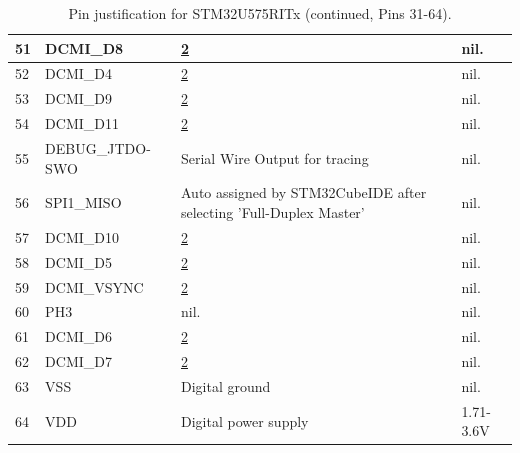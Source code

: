 \begin{table}[H]
\begin{tabular}{|l|p{3cm}|p{6.5cm}|p{3.5cm}|}
        51 & DCMI\_D8 & \hyperlink{dcmi-reason}{2} & nil. \\ \hline
        52 & DCMI\_D4 & \hyperlink{dcmi-reason}{2} & nil. \\ \hline
        53 & DCMI\_D9 & \hyperlink{dcmi-reason}{2} & nil. \\ \hline
        54 & DCMI\_D11 & \hyperlink{dcmi-reason}{2} & nil. \\ \hline
        55 & DEBUG\_JTDO-SWO & Serial Wire Output for tracing & nil. \\ \hline
        56 & SPI1\_MISO & Auto assigned by STM32CubeIDE after selecting 'Full-Duplex Master' & nil. \\ \hline
        57 & DCMI\_D10 & \hyperlink{dcmi-reason}{2} & nil. \\ \hline
        58 & DCMI\_D5 & \hyperlink{dcmi-reason}{2} & nil. \\ \hline
        59 & DCMI\_VSYNC & \hyperlink{dcmi-reason}{2} & nil. \\ \hline
        60 & PH3 & nil. & nil. \\ \hline
        61 & DCMI\_D6 & \hyperlink{dcmi-reason}{2} & nil. \\ \hline
        62 & DCMI\_D7 & \hyperlink{dcmi-reason}{2} & nil. \\ \hline
        63 & VSS & Digital ground & nil. \\ \hline
        64 & VDD & Digital power supply & 1.71-3.6V \\ \hline
    \end{tabular}
    \caption{Pin justification for STM32U575RITx (continued, Pins 31-64).}
\end{table}